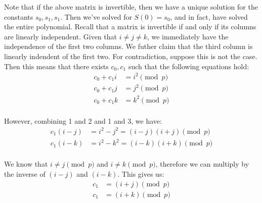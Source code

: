 \documentclass{article}
\begin{document}
\begin{enumerate}
\begin{enumerate}[,label=\alph*.]
Note that if the above matrix is invertible, then we have a unique solution for the constants
$s_0,s_1,s_1$. Then we've solved for $S(0) = s_0$, and in fact, have solved the entire polynomial.
Recall that a matrix is invertible if and only if its columns are linearly independent. Given
that $i \neq j \neq k$, we immediately have the independence of the first two columns. We
futher claim that the third column is linearly indendent of the first two. For contradiction,
suppose this is not the case. Then this means that there exists $c_0,c_1$ such that the following
equations hold:%
\noindent\noindent\[%
\begin{aligned}
c_0 + c_1 i &= i^2 \pmod{p} \\
c_0 + c_1 j &= j^2 \pmod{p} \\
c_0 + c_1 k &= k^2 \pmod{p} \\
\end{aligned}
\]%

However, combining 1 and 2 and 1 and 3, we have:%
\noindent\noindent\[%
\begin{aligned}
c_1 (i-j) &= i^2 - j^2 = (i-j)(i+j) \pmod{p}\\
c_1 (i-k) &= i^2 - k^2 = (i-k)(i+k)\pmod{p}\\
\end{aligned}
\]%

We know that $i \neq j \pmod p$ and $i \neq k \pmod p$, 
therefore we can multiply by the inverse of $(i-j)$ and $(i-k)$. This gives us:%
\noindent\noindent\[%
\begin{aligned}
c_1 &= (i+j) \pmod{p}\\
c_1 &= (i+k) \pmod{p}
\end{aligned}
\]%


\end{enumerate}
\end{enumerate}
\end{document}
